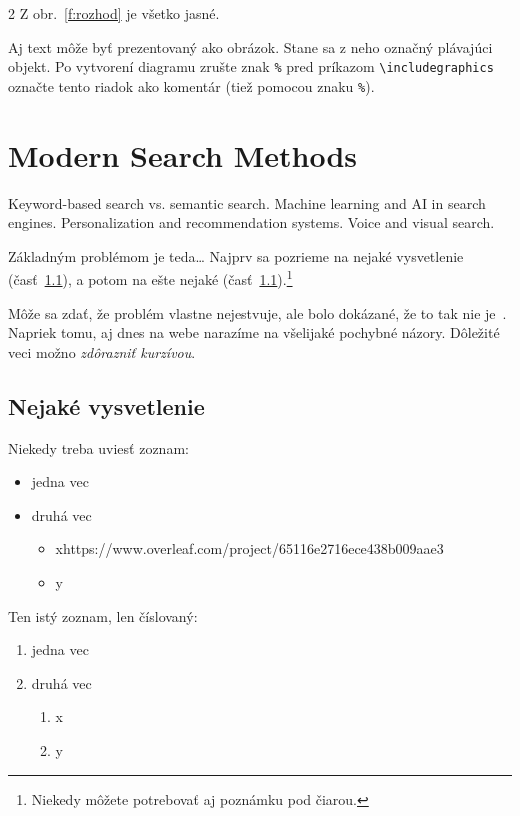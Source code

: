 \documentclass[14pt,twoside,slovak,a4paper]{coursepaper}
\begin{document}
\begin{multicols}{2}
Z obr.~\ref{f:rozhod} je všetko jasné. 

\begin{figure*}[tbh]
\centering
Aj text môže byť prezentovaný ako obrázok. Stane sa z neho označný plávajúci objekt. Po vytvorení diagramu zrušte znak \texttt{\%} pred príkazom \verb|\includegraphics| označte tento riadok ako komentár (tiež pomocou znaku \texttt{\%}).
\caption{Rozhodujúci argument.}
\label{f:rozhod}
\end{figure*}



\section{Modern Search Methods} \label{ina}
Keyword-based search vs. semantic search.
Machine learning and AI in search engines.
Personalization and recommendation systems.
Voice and visual search.

Základným problémom je teda\ldots{} Najprv sa pozrieme na nejaké vysvetlenie (časť~\ref{ina:nejake}), a potom na ešte nejaké (časť~\ref{ina:nejake}).\footnote{Niekedy môžete potrebovať aj poznámku pod čiarou.}

Môže sa zdať, že problém vlastne nejestvuje\cite{Coplien:MPD}, ale bolo dokázané, že to tak nie je~\cite{Czarnecki:Staged, Czarnecki:Progress}. Napriek tomu, aj dnes na webe narazíme na všelijaké pochybné názory\cite{PLP-Framework}. Dôležité veci možno \emph{zdôrazniť kurzívou}.


\subsection{Nejaké vysvetlenie} \label{ina:nejake}

Niekedy treba uviesť zoznam:

\begin{itemize}
\item jedna vec
\item druhá vec
	\begin{itemize}
	\item xhttps://www.overleaf.com/project/65116e2716ece438b009aae3
	\item y
	\end{itemize}
\end{itemize}

Ten istý zoznam, len číslovaný:

\begin{enumerate}
\item jedna vec
\item druhá vec
	\begin{enumerate}
	\item x
	\item y
	\end{enumerate}
\end{enumerate}



\end{multicols}
\end{document}
